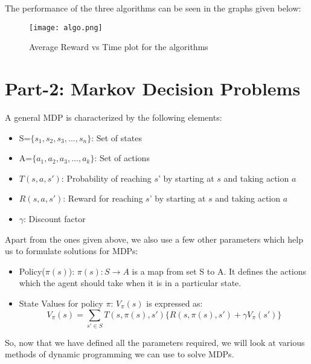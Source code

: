 \documentclass[12pt]{article}
\begin{document}
 \newpage
 \noindent
The performance of the three algorithms can be seen in the graphs given below:
\begin{figure}[ht]
  \centering
  \texttt{[image: algo.png]}
  \caption{Average Reward vs Time plot for the algorithms}
  \label{fig:demofig1}
\end{figure}

    

\section{Part-2: Markov Decision Problems}
A general MDP is characterized by the following elements:
\begin{itemize}
    \item S=$\bigl\{s_{1},s_{2},s_{3},...,s_{n}\bigl\}$: Set of states
    \item A=$\bigl\{a_{1},a_{2},a_{3},...,a_{k}\bigl\}$: Set of actions
    \item $T(s,a,s')$: Probability of reaching $s$' by starting at $s$ and taking action $a$
    \item $R(s,a,s')$: Reward for reaching $s$' by starting at $s$ and taking action $a$
    \item $\gamma$: Discount factor
\end{itemize}

\noindent
Apart from the ones given above, we also use a few other parameters which help us to formulate solutions for MDPs:
\begin{itemize}
    \item Policy($\pi(s)$): $\pi(s):S\rightarrow A$ is a map from set S to A. It defines the actions which the agent should take when it is in a particular state.
    \item State Values for policy $\pi$:
    $V_{\pi}(s)$ is expressed as:
    \begin{equation}
        V_{\pi}(s)=\sum_{s'\in S}T(s,\pi(s),s')\bigl\{R(s,\pi(s),s')+\gamma V_{\pi}(s')\bigl\}
    \end{equation}
\end{itemize}

\noindent
So, now that we have defined all the parameters required, we will look at various methods of dynamic programming we can use to solve MDPs. 
\end{document}
